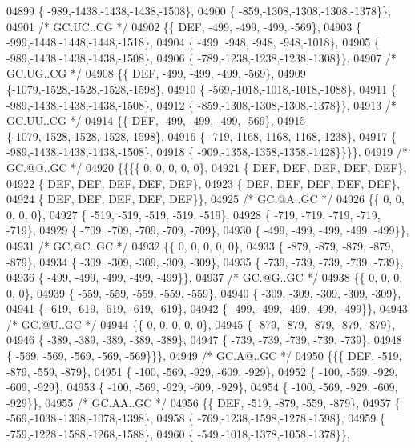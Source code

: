 \begin{DoxyCode}
04899 \{ -989,-1438,-1438,-1438,-1508\},
04900 \{ -859,-1308,-1308,-1308,-1378\}\},
04901 \textcolor{comment}{/* GC.UC..CG */}
04902 \{\{  DEF, -499, -499, -499, -569\},
04903 \{ -999,-1448,-1448,-1448,-1518\},
04904 \{ -499, -948, -948, -948,-1018\},
04905 \{ -989,-1438,-1438,-1438,-1508\},
04906 \{ -789,-1238,-1238,-1238,-1308\}\},
04907 \textcolor{comment}{/* GC.UG..CG */}
04908 \{\{  DEF, -499, -499, -499, -569\},
04909 \{-1079,-1528,-1528,-1528,-1598\},
04910 \{ -569,-1018,-1018,-1018,-1088\},
04911 \{ -989,-1438,-1438,-1438,-1508\},
04912 \{ -859,-1308,-1308,-1308,-1378\}\},
04913 \textcolor{comment}{/* GC.UU..CG */}
04914 \{\{  DEF, -499, -499, -499, -569\},
04915 \{-1079,-1528,-1528,-1528,-1598\},
04916 \{ -719,-1168,-1168,-1168,-1238\},
04917 \{ -989,-1438,-1438,-1438,-1508\},
04918 \{ -909,-1358,-1358,-1358,-1428\}\}\}\},
04919 \textcolor{comment}{/* GC.@@..GC */}
04920 \{\{\{\{    0,    0,    0,    0,    0\},
04921 \{  DEF,  DEF,  DEF,  DEF,  DEF\},
04922 \{  DEF,  DEF,  DEF,  DEF,  DEF\},
04923 \{  DEF,  DEF,  DEF,  DEF,  DEF\},
04924 \{  DEF,  DEF,  DEF,  DEF,  DEF\}\},
04925 \textcolor{comment}{/* GC.@A..GC */}
04926 \{\{    0,    0,    0,    0,    0\},
04927 \{ -519, -519, -519, -519, -519\},
04928 \{ -719, -719, -719, -719, -719\},
04929 \{ -709, -709, -709, -709, -709\},
04930 \{ -499, -499, -499, -499, -499\}\},
04931 \textcolor{comment}{/* GC.@C..GC */}
04932 \{\{    0,    0,    0,    0,    0\},
04933 \{ -879, -879, -879, -879, -879\},
04934 \{ -309, -309, -309, -309, -309\},
04935 \{ -739, -739, -739, -739, -739\},
04936 \{ -499, -499, -499, -499, -499\}\},
04937 \textcolor{comment}{/* GC.@G..GC */}
04938 \{\{    0,    0,    0,    0,    0\},
04939 \{ -559, -559, -559, -559, -559\},
04940 \{ -309, -309, -309, -309, -309\},
04941 \{ -619, -619, -619, -619, -619\},
04942 \{ -499, -499, -499, -499, -499\}\},
04943 \textcolor{comment}{/* GC.@U..GC */}
04944 \{\{    0,    0,    0,    0,    0\},
04945 \{ -879, -879, -879, -879, -879\},
04946 \{ -389, -389, -389, -389, -389\},
04947 \{ -739, -739, -739, -739, -739\},
04948 \{ -569, -569, -569, -569, -569\}\}\},
04949 \textcolor{comment}{/* GC.A@..GC */}
04950 \{\{\{  DEF, -519, -879, -559, -879\},
04951 \{ -100, -569, -929, -609, -929\},
04952 \{ -100, -569, -929, -609, -929\},
04953 \{ -100, -569, -929, -609, -929\},
04954 \{ -100, -569, -929, -609, -929\}\},
04955 \textcolor{comment}{/* GC.AA..GC */}
04956 \{\{  DEF, -519, -879, -559, -879\},
04957 \{ -569,-1038,-1398,-1078,-1398\},
04958 \{ -769,-1238,-1598,-1278,-1598\},
04959 \{ -759,-1228,-1588,-1268,-1588\},
04960 \{ -549,-1018,-1378,-1058,-1378\}\},

\end{DoxyCode}
